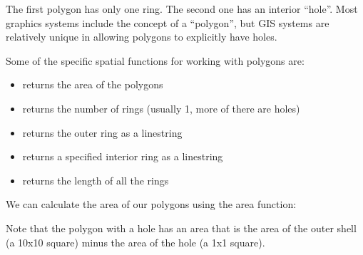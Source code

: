 \documentclass[a4paper,11pt,english]{sphinxmanual}
\begin{document}
The first polygon has only one ring. The second one has an interior “hole”. Most graphics systems include the concept of a “polygon”, but GIS systems are relatively unique in allowing polygons to explicitly have holes.


Some of the specific spatial functions for working with polygons are:
\begin{itemize}
\item {} 
 returns the area of the polygons

\item {} 
 returns the number of rings (usually 1, more of there are holes)

\item {} 
 returns the outer ring as a linestring

\item {} 
 returns a specified interior ring as a linestring

\item {} 
 returns the length of all the rings

\end{itemize}

We can calculate the area of our polygons using the area function:

\begin{sphinxVerbatim}[commandchars=\\\{\}]
  
   
     
\end{sphinxVerbatim}

\begin{sphinxVerbatim}[commandchars=\\\{\}]
            
    
\end{sphinxVerbatim}

Note that the polygon with a hole has an area that is the area of the outer shell (a 10x10 square) minus the area of the hole (a 1x1 square).
\end{document}
